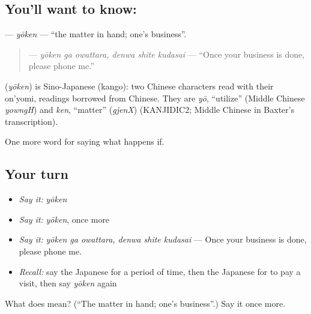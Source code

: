 \subsection*{You'll want to know: }
\textbf{} — \emph{yōken} — \textquotedblleft{}the matter in hand; one's business\textquotedblright{}.

\begin{quote}
\textbf{  } — \emph{yōken ga owattara, denwa shite kudasai} — \textquotedblleft{}Once your business is done, please phone me.\textquotedblright{}
\end{quote}

\begin{cousinweb}
\textbf{} (\emph{yōken}) is Sino-Japanese (kango): two Chinese characters read with their on'yomi, readings borrowed from Chinese. They are \emph{yō}, \textquotedblleft{}utilize\textquotedblright{} (Middle Chinese \emph{yowngH}) and \emph{ken}, \textquotedblleft{}matter\textquotedblright{} (\emph{gjenX}) (KANJIDIC2; Middle Chinese in Baxter's transcription).
\end{cousinweb}

\begin{grammarlens}[title={What you've built}]
One more word for saying what happens if.
\end{grammarlens}

\subsection*{Your turn}
\begin{itemize}
\raggedright
  \item \emph{Say it:} \emph{yōken}
  \item \emph{Say it:} \emph{yōken}, once more
  \item \emph{Say it:} \emph{yōken ga owattara, denwa shite kudasai} — Once your business is done, please phone me.
  \item \emph{Recall:} say the Japanese for a period of time, then the Japanese for to pay a visit, then say \emph{yōken} again
\end{itemize}

\begin{tcolorbox}[breakable,colback=teal!4,colframe=teal!35!black,title={Before you move on}]
What does  mean? (\textquotedblleft{}The matter in hand; one's business\textquotedblright{}.) Say it once more.
\end{tcolorbox}
